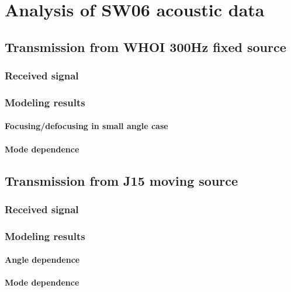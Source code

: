 \chapter{Analysis of SW06 acoustic data }
\section{Transmission from WHOI 300Hz fixed source}
\subsection{Received signal}
\subsection{Modeling results}
\subsubsection{Focusing/defocusing in small angle case}
\subsubsection{Mode dependence}
\section{Transmission from J15 moving source}
\subsection{Received signal}
\subsection{Modeling results}
\subsubsection{Angle dependence}
\subsubsection{Mode dependence}
